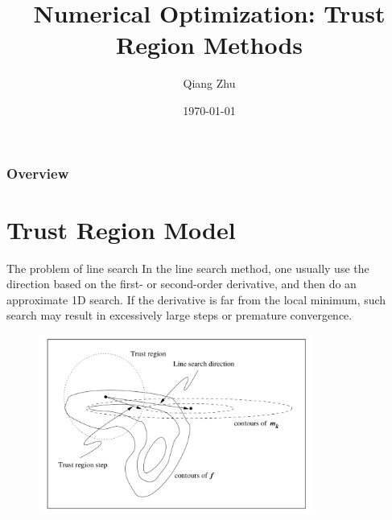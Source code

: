 \documentclass{beamer}
\title[Trust Region Methods]{Numerical Optimization: Trust Region Methods} %
\author{Qiang Zhu} %
\institute[University of Nevada Las Vegas] %
{
University of Nevada Las Vegas\\ %
\medskip
}
\date{\today} %
\begin{document}
\begin{frame}
\titlepage %
\end{frame}

\begin{frame}
\frametitle{Overview} %
\tableofcontents %
\end{frame}



\section{Trust Region Model}
\begin{frame}{The problem of line search}
In the line search method, one usually use the direction based on the first- or second-order derivative, and then do an approximate 1D search. 
If the derivative is far from the local minimum, such search may result in excessively large steps or premature convergence.

\begin{figure}
\centering
\includegraphics[width=90mm]{Figs/trust-region.jpeg}
\end{figure}
\end{frame}
\end{document}
